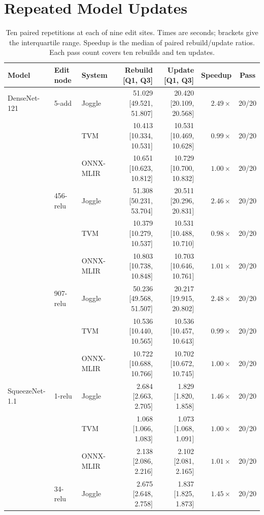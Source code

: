 \section{Repeated Model Updates}
\label{sec:update-data}
\begin{table}[!htbp]
\centering\scriptsize
\caption{Ten paired repetitions at each of nine edit sites. Times are seconds; brackets give the interquartile range. Speedup is the median of paired rebuild/update ratios. Each pass count covers ten rebuilds and ten updates.}
\label{tab:update-sites}
\setlength{\tabcolsep}{4pt}
\renewcommand{\arraystretch}{1.12}
\begin{tabular*}{\textwidth}{@{\extracolsep{\fill}}lllrrrc@{}}
\toprule Model & Edit node & System & Rebuild [Q1, Q3] & Update [Q1, Q3] & Speedup & Pass \\
\midrule
DenseNet-121 & 5-add & Joggle & 51.029 [49.521, 51.807] & 20.420 [20.109, 20.568] & $2.49\times$ & 20/20 \\
 &  & TVM & 10.413 [10.334, 10.531] & 10.531 [10.469, 10.628] & $0.99\times$ & 20/20 \\
 &  & ONNX-MLIR & 10.651 [10.623, 10.812] & 10.729 [10.700, 10.832] & $1.00\times$ & 20/20 \\
 & 456-relu & Joggle & 51.308 [50.231, 53.704] & 20.511 [20.296, 20.831] & $2.46\times$ & 20/20 \\
 &  & TVM & 10.379 [10.279, 10.537] & 10.531 [10.488, 10.710] & $0.98\times$ & 20/20 \\
 &  & ONNX-MLIR & 10.803 [10.738, 10.848] & 10.703 [10.646, 10.761] & $1.01\times$ & 20/20 \\
 & 907-relu & Joggle & 50.236 [49.568, 51.507] & 20.217 [19.915, 20.802] & $2.48\times$ & 20/20 \\
 &  & TVM & 10.536 [10.440, 10.565] & 10.536 [10.457, 10.643] & $0.99\times$ & 20/20 \\
 &  & ONNX-MLIR & 10.722 [10.688, 10.766] & 10.702 [10.672, 10.745] & $1.00\times$ & 20/20 \\
\midrule
SqueezeNet-1.1 & 1-relu & Joggle & 2.684 [2.663, 2.705] & 1.829 [1.820, 1.858] & $1.46\times$ & 20/20 \\
 &  & TVM & 1.068 [1.066, 1.083] & 1.073 [1.068, 1.091] & $1.00\times$ & 20/20 \\
 &  & ONNX-MLIR & 2.138 [2.086, 2.216] & 2.102 [2.081, 2.165] & $1.01\times$ & 20/20 \\
 & 34-relu & Joggle & 2.675 [2.648, 2.758] & 1.837 [1.825, 1.873] & $1.45\times$ & 20/20 \\

\end{tabular*}
\end{table}
